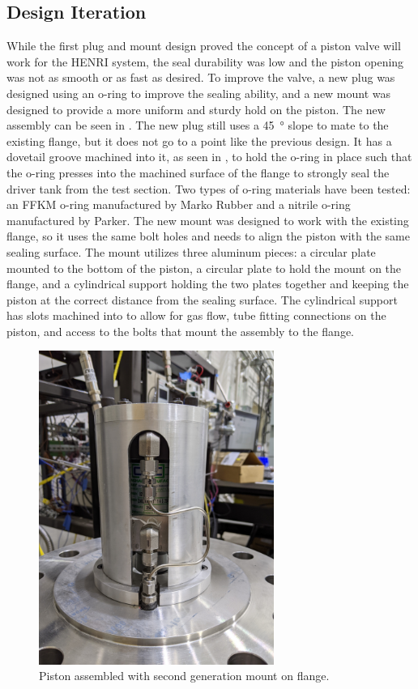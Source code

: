 \subsection{Design Iteration} \label{s:iteration}
While the first plug and mount design proved the concept of a piston valve will work for the HENRI system, the seal durability was low and the piston opening was not as smooth or as fast as desired. To improve the valve, a new plug was designed using an o-ring to improve the sealing ability, and a new mount was designed to provide a more uniform and sturdy hold on the piston. The new assembly can be seen in . The new plug still uses a \SI{45}{\degree} slope to mate to the existing flange, but it does not go to a point like the previous design. It has a dovetail groove machined into it, as seen in , to hold the o-ring in place such that the o-ring presses into the machined surface of the flange to strongly seal the driver tank from the test section. Two types of o-ring materials have been tested: an FFKM o-ring manufactured by Marko Rubber and a nitrile o-ring manufactured by Parker. The new mount was designed to work with the existing flange, so it uses the same bolt holes and needs to align the piston with the same sealing surface. The mount utilizes three aluminum pieces: a circular plate mounted to the bottom of the piston, a circular plate to hold the mount on the flange, and a cylindrical support holding the two plates together and keeping the piston at the correct distance from the sealing surface. The cylindrical support has slots machined into to allow for gas flow, tube fitting connections on the piston, and access to the bolts that mount the assembly to the flange.


%
\begin{figure}[htbp]
    \vspace{16pt}
    \centering
    \includegraphics[width=3.024in, height=4.032in]{experiment/photos/Piston_Assembly.jpg}
    \caption{Piston assembled with second generation mount on flange.}
    \label{fig:piston assembly}
    \vspace{16pt}
\end{figure}
%


